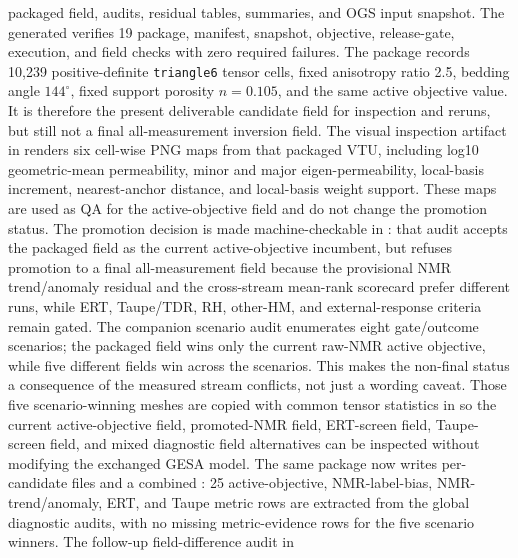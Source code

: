 packaged field, audits, residual tables, summaries, and OGS input snapshot.  The
generated  verifies 19 package,
manifest, snapshot, objective, release-gate, execution, and field checks with zero
required failures.  The package records 10,239 positive-definite
\texttt{triangle6} tensor cells, fixed anisotropy ratio 2.5,
bedding angle \(144^\circ\), fixed support porosity \(n=0.105\), and the same active
objective value.  It is therefore the present deliverable candidate field for
inspection and reruns, but still not a final all-measurement inversion field.
The visual inspection artifact in
renders six cell-wise PNG maps from that packaged VTU, including log10
geometric-mean permeability, minor and major eigen-permeability, local-basis
increment, nearest-anchor distance, and local-basis weight support.  These maps are
used as QA for the active-objective field and do not change the promotion status.
The promotion decision is made machine-checkable in
: that audit accepts the
packaged field as the current active-objective incumbent, but refuses promotion to a
final all-measurement field because the provisional NMR trend/anomaly residual and
the cross-stream mean-rank scorecard prefer different runs, while ERT, Taupe/TDR,
RH, other-HM, and external-response criteria remain gated.
The companion scenario audit
 enumerates eight
gate/outcome scenarios; the packaged field wins only the current raw-NMR active
objective, while five different fields win across the scenarios.  This makes the
non-final status a consequence of the measured stream conflicts, not just a
wording caveat.
Those five scenario-winning meshes are copied with common tensor statistics in
so the current active-objective field, promoted-NMR field, ERT-screen field,
Taupe-screen field, and mixed diagnostic field alternatives can be inspected without
modifying the exchanged GESA model.  The same package now writes per-candidate
 files and a combined
: 25 active-objective,
NMR-label-bias, NMR-trend/anomaly, ERT, and Taupe metric rows are extracted from
the global diagnostic audits, with no missing metric-evidence rows for the five
scenario winners.
The follow-up field-difference audit in
